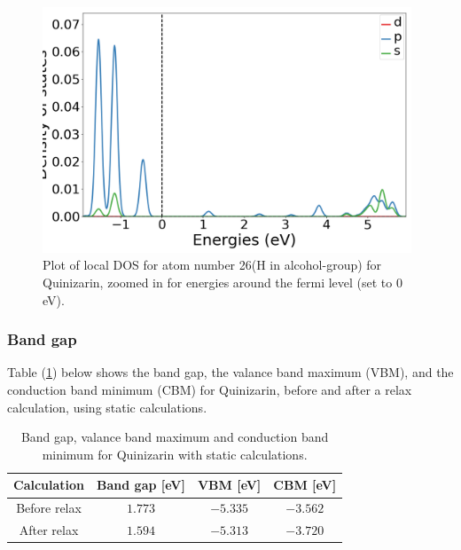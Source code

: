 \documentclass{article}
\begin{document}
      \begin{figure}[H]
        \centering
        \includegraphics[width = 11cm]{../fig/basic_LDOS26_2.png}
        \caption{Plot of local DOS for atom number 26(H in alcohol-group) for Quinizarin, zoomed in for energies around the fermi level (set to 0 eV). }
        \label{fig:basic_LDOS26_2}
      \end{figure}

      \vspace{1cm}

    \subsubsection{Band gap}

      Table (\ref{tab:bandgapquinizarin}) below shows the band gap, the valance band maximum (VBM), and the conduction band minimum (CBM) for Quinizarin, before and after a relax calculation, using static calculations. \\

      \begin{table}[H]
        \centering
        \caption{Band gap, valance band maximum and conduction band minimum for Quinizarin with static calculations. }
        \label{tab:bandgapquinizarin}
        \begin{tabular}{|c|c|c|c|}
            \hline
            Calculation & Band gap [eV] & VBM [eV] & CBM [eV]  \\
            \hline \hline
            Before relax & $1.773$ & $-5.335$ & $-3.562$ \\
            After relax & $1.594$ & $-5.313$ & $-3.720$ \\
            \hline
        \end{tabular} \\
        \hspace{0pt}\\
      \end{table}
\end{document}
